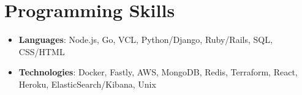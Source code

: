 \documentclass[letterpaper,11pt]{article}
\newcommand{\resumeItem}[2]{
  \item\small{
    \textbf{#1}{: #2 \vspace{-2pt}}
  }
}
\newcommand{\resumeSubItem}[2]{\resumeItem{#1}{#2}\vspace{-4pt}}
\newcommand{\resumeSubHeadingListStart}{\begin{itemize}[leftmargin=*]}
\newcommand{\resumeSubHeadingListEnd}{\end{itemize}}
\begin{document}
\section{Programming Skills}
  \resumeSubHeadingListStart
    \resumeSubItem{Languages}
      {Node.js, Go, VCL, Python/Django, Ruby/Rails, SQL, CSS/HTML}
    \resumeSubItem{Technologies}
      {Docker, Fastly, AWS, MongoDB, Redis, Terraform, React, Heroku, ElasticSearch/Kibana, Unix }
  \resumeSubHeadingListEnd

%


\end{document}

